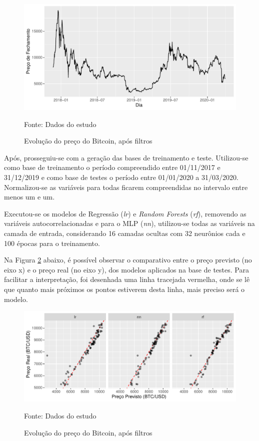 \documentclass[12pt]{article}
\begin{document}
\begin{figure}[!ht]
  \centering
  \includegraphics[scale = 0.7]{img/dataset.pdf}
  \caption{Evolução do preço do Bitcoin, após filtros}
  Fonte: Dados do estudo
  \label{fig:dataset}
\end{figure}


Após, prosseguiu-se com a geração das bases de treinamento e teste. Utilizou-se 
como base de treinamento o período compreendido entre 01/11/2017 e 31/12/2019 e
como base de testes o período entre 01/01/2020 a 31/03/2020. Normalizou-se as 
variáveis para todas ficarem compreendidas no intervalo entre menos um e um. 

Executou-se os modelos de Regressão (\textit{lr}) e \textit{Random Forests} 
(\textit{rf}), removendo as variáveis autocorrelacionadas e para o MLP 
(\textit{nn}), utilizou-se todas as variáveis na camada de entrada, considerando 
16 camadas ocultas com 32 neurônios cada e 100 épocas para o treinamento.

Na Figura \ref{fig:results_scatter} abaixo, é possível observar o comparativo
entre o preço previsto (no eixo x) e o preço real (no eixo y), dos modelos 
aplicados na base de testes. Para facilitar a interpretação, foi desenhada uma 
linha tracejada vermelha, onde se lê que quanto mais próximos os pontos estiverem
desta linha, mais preciso será o modelo.

\begin{figure}[!ht]
  \centering
  \includegraphics[scale = 0.8]{img/results_scatter.pdf}
  \caption{Evolução do preço do Bitcoin, após filtros}
  Fonte: Dados do estudo
  \label{fig:results_scatter}
\end{figure}
\end{document}
